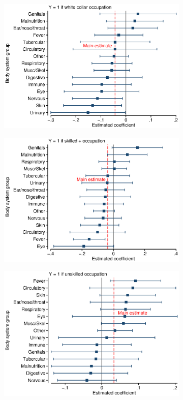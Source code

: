 \documentclass[12pt,english]{article}
\begin{document}
\begin{figure}[!ht]
\begin{subfigure}{0.49\textwidth}
	\includegraphics[width=1.00\linewidth]{../output/02_appendix/figure_a11_panel_3.eps}
\end{subfigure}
\begin{subfigure}{0.49\textwidth}
	\centering
	\includegraphics[width=1.00\linewidth]{../output/02_appendix/figure_a11_panel_4.eps}
\end{subfigure}
\begin{subfigure}{0.49\textwidth}
	\centering
	\includegraphics[width=1.00\linewidth]{../output/02_appendix/figure_a11_panel_5.eps}

\end{subfigure}
\end{figure}
\end{document}
